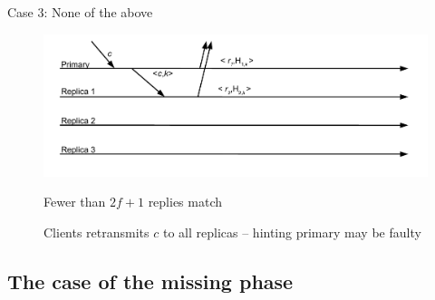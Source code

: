 \begin{frame}{Case 3: None of the above}

\begin{figure}
	\includegraphics[width=\textwidth]{figs/17/messages11}	
	
\BIL
\item Fewer than $2f+1$ replies match
\item Clients retransmits $c$ to all replicas -- hinting primary may be faulty
\EIL	
	
\end{figure}

\end{frame}

\subsection{The case of the missing phase}

